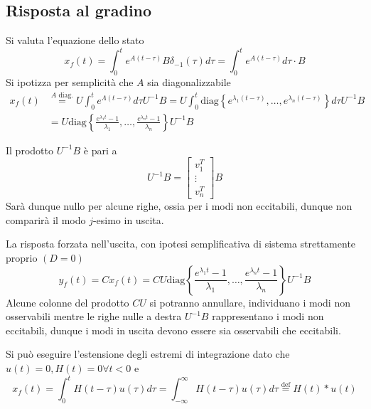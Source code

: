 \subsection{Risposta al gradino}
Si valuta l'equazione dello stato
$$
x_f(t) = \int_0^t e^{A(t-\tau)}B\delta_{-1}(\tau)d\tau =
\int_0^t e^{A(t-\tau)} d\tau\cdot B
$$
Si ipotizza per semplicità che $A$ sia
diagonalizzabile
$$\begin{aligned}
x_f(t)&\stackrel{A\text{ diag.}}{=}
U\int_0^t e^{\Lambda(t-\tau)}d\tau U^{-1} B = U
\int_0^t\text{diag}\left\{e^{\lambda_1(t-\tau)}
,\ldots,e^{\lambda_n(t-\tau)}
\right\} d \tau U^{-1}B\\
&= U\text{diag}\left\{
\frac{e^{\lambda_1t}-1}{\lambda_1},\ldots,\frac{e^{\lambda_nt}-1}{\lambda_n}
\right\}U^{-1}B
\end{aligned}$$

Il prodotto $U^{-1}B$ è pari a
$$
U^{-1}B = \begin{bmatrix}
           v_1^T \\
           \vdots \\
           v_n^T
          \end{bmatrix}B
$$
Sarà dunque nullo per alcune righe, ossia per i modi non eccitabili, dunque non
comparirà il modo $j$-esimo in uscita.

La risposta forzata nell'uscita, con ipotesi semplificativa di sistema
strettamente proprio $(D=0)$
$$
y_f(t) = Cx_f(t) = CU\text{diag}\left\{
\frac{e^{\lambda_1t}-1}{\lambda_1},\ldots,\frac{e^{\lambda_nt}-1}{\lambda_n}
\right\}U^{-1}B
$$
Alcune colonne del prodotto $CU$ si potranno annullare, individuano i modi non
osservabili mentre le righe nulle a destra $U^{-1}B$ rappresentano i modi non
eccitabili, dunque i modi in uscita devono essere sia osservabili che
eccitabili.

Si può eseguire l'estensione degli estremi di integrazione dato che
$u(t)=0,H(t)=0\forall t<0$ e
$$
x_f(t) = \int_0^t H(t-\tau) u(\tau) d\tau = \int_{-\infty}^{\infty} H(t-\tau)
u(\tau)d\tau \stackrel{\text{def}}{=} H(t)*u(t)
$$
